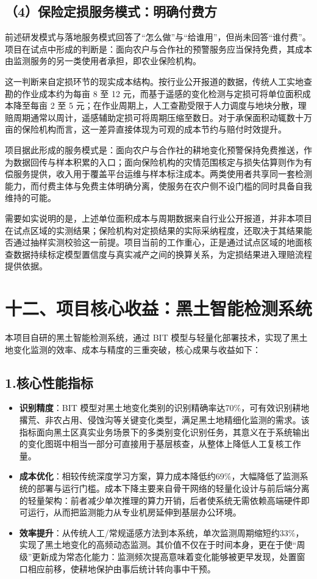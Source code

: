 \documentclass[12pt, a4paper]{ctexart}
\begin{document}
\subsection{（4）保险定损服务模式：明确付费方}

前述研发模式与落地服务模式回答了“怎么做”与“给谁用”，但尚未回答“谁付费”。项目在试点中形成的判断是：面向农户与合作社的预警服务应当保持免费，其成本由监测服务的另一类使用者承担，即农业保险机构。

这一判断来自定损环节的现实成本结构。按行业公开报道的数据，传统人工实地查勘的作业成本约为每亩 8 至 12 元，而基于遥感的变化检测与定损可将单位面积成本降至每亩 2 至 5 元；在作业周期上，人工查勘受限于人力调度与地块分散，理赔周期通常以周计，遥感辅助定损可将周期压缩至数日。对于承保面积动辄数十万亩的保险机构而言，这一差异直接体现为可观的成本节约与赔付时效提升。

项目据此形成的服务模式是：面向农户与合作社的耕地变化预警保持免费推送，作为数据回传与样本积累的入口；面向保险机构的灾情范围核定与损失估算则作为有偿服务提供，收入用于覆盖平台运维与样本标注成本。两类使用者共享同一套检测能力，而付费主体与免费主体明确分离，使服务在农户侧不设门槛的同时具备自我维持的可能。

需要如实说明的是，上述单位面积成本与周期数据来自行业公开报道，并非本项目在试点区域的实测结果；保险机构对定损结果的实际采纳程度，还取决于其结果能否通过抽样实测校验这一前提。项目当前的工作重心，正是通过试点区域的地面核查数据持续标定模型置信度与真实减产之间的换算关系，为定损结果进入理赔流程提供依据。

\section{十二、项目核心收益：黑土智能检测系统}

本项目自研的黑土智能检测系统，通过 BIT 模型与轻量化部署技术，实现了黑土地变化监测的效率、成本与精度的三重突破，核心成果与收益如下：

\subsection{1.核心性能指标}

\begin{itemize}
  \item \textbf{识别精度}：BIT 模型对黑土地变化类别的识别精确率达70\%，可有效识别耕地撂荒、非农占用、侵蚀沟等关键变化类型，满足黑土地精细化监测的需求。该指标面向黑土区真实业务场景下的多类别变化识别任务，其意义在于系统输出的变化图斑中相当一部分可直接用于基层核查，从整体上降低人工复核工作量。
  \item \textbf{成本优化}：相较传统深度学习方案，算力成本降低约69\%，大幅降低了监测系统的部署与运行门槛。成本下降主要来自骨干网络的轻量化设计与前后端分离的轻量架构：前者减少单次推理的算力开销，后者使系统无需依赖高端硬件即可运行，从而把监测能力从专业机房延伸到基层办公环境。
  \item \textbf{效率提升}：从传统人工/常规遥感方法到本系统，单次监测周期缩短约33\%，实现了黑土地变化的高频动态监测。其价值不仅在于时间本身，更在于使“周级”更新成为常态化能力：监测频次提高意味着变化能够被更早发现，处置窗口相应前移，使耕地保护由事后统计转向事中干预。
\end{itemize}
\end{document}
